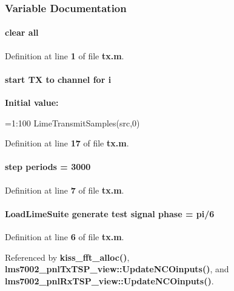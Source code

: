 \subsubsection{Variable Documentation}
\paragraph[{all}]{\setlength{\rightskip}{0pt plus 5cm}clear all}\label{tx_8m_a4603254d9990f7140c024d51302d1a8f}


Definition at line {\bf 1} of file {\bf tx.\+m}.

\paragraph[{i}]{\setlength{\rightskip}{0pt plus 5cm}start TX to channel for i}\label{tx_8m_a41e8073ed135dd0ebd062821682fe9e4}
{\bfseries Initial value\+:}
\begin{DoxyCode}
=1:100
    LimeTransmitSamples(src,0)
\end{DoxyCode}


Definition at line {\bf 17} of file {\bf tx.\+m}.

\paragraph[{periods}]{ step periods = 3000}\label{tx_8m_a55f5d1cef0f25b5af09db82e462128b5}


Definition at line {\bf 7} of file {\bf tx.\+m}.

\paragraph[{phase}]{\setlength{\rightskip}{0pt plus 5cm}Load\+Lime\+Suite generate test signal phase = pi/6}\label{tx_8m_abb6310603dc6ee11b661f6322ce02e70}


Definition at line {\bf 6} of file {\bf tx.\+m}.



Referenced by {\bf kiss\+\_\+fft\+\_\+alloc()}, {\bf lms7002\+\_\+pnl\+Tx\+T\+S\+P\+\_\+view\+::\+Update\+N\+C\+Oinputs()}, and {\bf lms7002\+\_\+pnl\+Rx\+T\+S\+P\+\_\+view\+::\+Update\+N\+C\+Oinputs()}.

